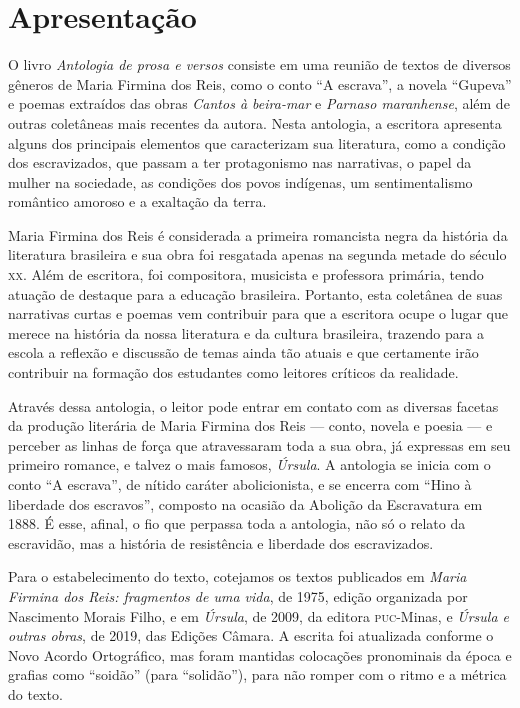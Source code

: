 \chapter{Apresentação}

O livro \emph{Antologia de prosa e versos} consiste em uma reunião de
textos de diversos gêneros de Maria Firmina dos Reis, como o conto ``A
escrava'', a novela ``Gupeva'' e poemas extraídos das obras \emph{Cantos
à beira-mar} e \emph{Parnaso maranhense}, além de outras coletâneas mais
recentes da autora. Nesta antologia, a escritora apresenta alguns dos
principais elementos que caracterizam sua literatura, como a condição
dos escravizados, que passam a ter protagonismo nas narrativas, o papel
da mulher na sociedade, as condições dos povos indígenas, um
sentimentalismo romântico amoroso e a exaltação da terra.

Maria Firmina dos Reis é considerada a primeira romancista negra da
história da literatura brasileira e sua obra foi resgatada apenas na
segunda metade do século \textsc{xx}. Além de escritora, foi compositora,
musicista e professora primária, tendo atuação de destaque para a
educação brasileira. Portanto, esta coletânea de suas narrativas curtas
e poemas vem contribuir para que a escritora ocupe o lugar que merece na
história da nossa literatura e da cultura brasileira, trazendo para a
escola a reflexão e discussão de temas ainda tão atuais e que certamente
irão contribuir na formação dos estudantes como leitores críticos da
realidade.

Através dessa antologia, o leitor pode entrar em contato com as diversas facetas da produção literária de Maria Firmina dos Reis --- conto, novela e poesia --- e perceber as linhas de força que atravessaram toda a sua obra, já expressas em seu primeiro romance, e talvez o mais famosos, \textit{Úrsula}. A antologia se inicia com o conto ``A escrava'', de nítido caráter abolicionista, e se encerra com ``Hino à liberdade dos escravos'', composto na ocasião da Abolição da Escravatura em 1888. É esse, afinal, o fio que perpassa toda a antologia, não só o relato da escravidão, mas a história de resistência e liberdade dos escravizados.

Para o estabelecimento do texto, cotejamos os textos publicados em
\emph{Maria Firmina dos Reis: fragmentos de uma vida}, de 1975, edição
organizada por Nascimento Morais Filho, e em \emph{Úrsula}, de 2009, da
editora \textsc{puc}-Minas, e \emph{Úrsula e outras obras}, de 2019, das Edições
Câmara. A escrita foi atualizada conforme o Novo Acordo Ortográfico, mas
foram mantidas colocações pronominais da época e grafias como ``soidão''
(para ``solidão''), para não romper com o ritmo e a métrica do texto.


